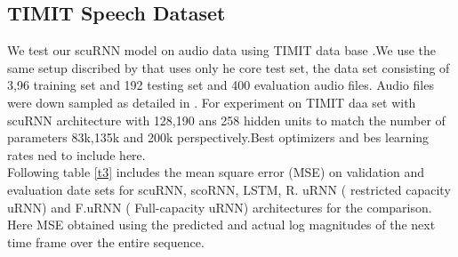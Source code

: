 \documentclass[letterpaper]{article} %
\begin{document}
\subsection{TIMIT Speech Dataset}
We test our scuRNN model on audio data using TIMIT data base \cite{garafolo93}.We use the same setup discribed by \cite{kyle17} that uses only he core test set, the data set consisting of 3,96 training set and 192 testing set and 400 evaluation audio files. Audio files were down sampled as detailed in \cite{Wisdom16}. For experiment on TIMIT daa set with scuRNN architecture with 128,190 ans 258 hidden units to match the number of parameters 83k,135k and 200k perspectively.Best optimizers and bes learning rates ned to include here.\\

\noindent Following table \ref{t3} includes the  mean square error (MSE) on validation and evaluation date sets for scuRNN, scoRNN, LSTM, R. uRNN ( restricted capacity uRNN) and F.uRNN ( Full-capacity uRNN) architectures for the comparison. Here MSE obtained using the predicted and actual log magnitudes of the next time frame over the entire sequence.
\end{document}
